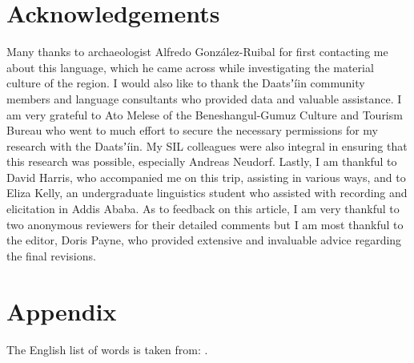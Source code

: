 \documentclass[output=paper]{langsci/langscibook}
\begin{document}
\section*{Acknowledgements}

Many thanks to archaeologist Alfredo González-Ruibal for first contacting me about this language, which he came across while investigating the material culture of the region. I would also like to thank the Daatsʼíin community members and language consultants who provided data and valuable assistance. I am very grateful to Ato Melese of the Beneshangul-Gumuz Culture and Tourism Bureau who went to much effort to secure the necessary permissions for my research with the Daatsʼíin. My SIL colleagues were also integral in ensuring that this research was possible, especially Andreas Neudorf. Lastly, I am thankful to David Harris, who accompanied me on this trip, assisting in various ways, and to Eliza Kelly, an undergraduate linguistics student who assisted with recording and elicitation in Addis Ababa. As to feedback on this article, I am very thankful to two anonymous reviewers for their detailed comments but I am most thankful to the editor, Doris Payne, who provided extensive and invaluable advice regarding the final revisions.

\section*{Appendix}

The English list of words is taken from: \citet{HaspelmathTadmor2009}.
\end{document}
